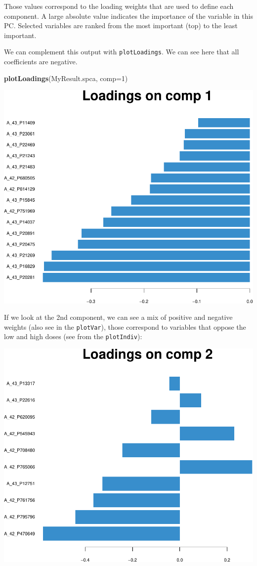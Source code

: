 \documentclass[]{book}
\newenvironment{Shaded}{\begin{snugshade}}{\end{snugshade}}
\newcommand{\DataTypeTok}[1]{\textcolor[rgb]{0.13,0.29,0.53}{#1}}
\newcommand{\DecValTok}[1]{\textcolor[rgb]{0.00,0.00,0.81}{#1}}
\newcommand{\KeywordTok}[1]{\textcolor[rgb]{0.13,0.29,0.53}{\textbf{#1}}}
\newcommand{\NormalTok}[1]{#1}
\begin{document}
Those values correspond to the loading weights that are used to define each component. A large absolute value indicates the importance of the variable in this PC. Selected variables are ranked from the most important (top) to the least important.

We can complement this output with \texttt{plotLoadings}. We can see here that all coefficients are negative.

\begin{Shaded}
\begin{Highlighting}[]
\KeywordTok{plotLoadings}\NormalTok{(MyResult.spca, }\DataTypeTok{comp=}\DecValTok{1}\NormalTok{)}
\end{Highlighting}
\end{Shaded}

\begin{center}\includegraphics[width=0.5\linewidth,]{Figures/03-pca-liver-plotLoadings-1} \end{center}

If we look at the 2nd component, we can see a mix of positive and negative weights (also see in the \texttt{plotVar}), those correspond to variables that oppose the low and high doses (see from the \texttt{plotIndiv}):

\begin{center}\includegraphics[width=0.5\linewidth,]{Figures/03-pca-liver-comp2-1} \end{center}
\end{document}
